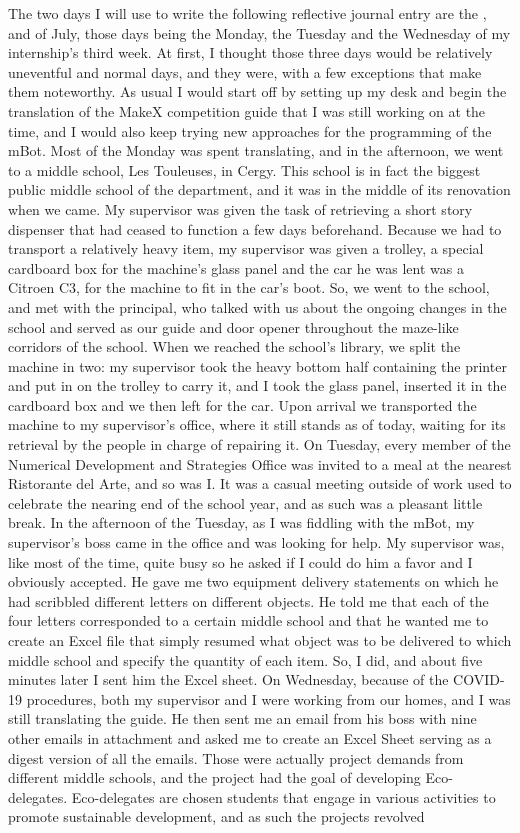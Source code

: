 \documentclass[12pt]{article}
\begin{document}
The two days I will use to write the following reflective journal entry are the ,  and  of July, those days being the Monday, the Tuesday and the Wednesday of my internship's third week. At first, I thought those three days would be relatively uneventful and normal days, and they were, with a few exceptions that make them noteworthy. As usual I would start off by setting up my desk and begin the translation of the MakeX competition guide that I was still working on at the time, and I would also keep trying new approaches for the programming of the mBot. Most of the Monday was spent translating, and in the afternoon, we went to a middle school, Les Touleuses, in Cergy. This school is in fact the biggest public middle school of the department, and it was in the middle of its renovation when we came. My supervisor was given the task of retrieving a short story dispenser that had ceased to function a few days beforehand. Because we had to transport a relatively heavy item, my supervisor was given a trolley, a special cardboard box for the machine's glass panel and the car he was lent was a Citroen C3, for the machine to fit in the car's boot. So, we went to the school, and met with the principal, who talked with us about the ongoing changes in the school and served as our guide and door opener throughout the maze-like corridors of the school. When we reached the school's library, we split the machine in two: my supervisor took the heavy bottom half containing the printer and put in on the trolley to carry it, and I took the glass panel, inserted it in the cardboard box and we then left for the car. Upon arrival we transported the machine to my supervisor's office, where it still stands as of today, waiting for its retrieval by the people in charge of repairing it. On Tuesday, every member of the Numerical Development and Strategies Office was invited to a meal at the nearest Ristorante del Arte, and so was I. It was a casual meeting outside of work used to celebrate the nearing end of the school year, and as such was a pleasant little break. In the afternoon of the Tuesday, as I was fiddling with the mBot, my supervisor's boss came in the office and was looking for help. My supervisor was, like most of the time, quite busy so he asked if I could do him a favor and I obviously accepted. He gave me two equipment delivery statements on which he had scribbled different letters on different objects. He told me that each of the four letters corresponded to a certain middle school and that he wanted me to create an Excel file that simply resumed what object was to be delivered to which middle school and specify the quantity of each item. So, I did, and about five minutes later I sent him the Excel sheet. On Wednesday, because of the COVID-19 procedures, both my supervisor and I were working from our homes, and I was still translating the guide. He then sent me an email from his boss with nine other emails in attachment and asked me to create an Excel Sheet serving as a digest version of all the emails. Those were actually project demands from different middle schools, and the project had the goal of developing Eco-delegates. Eco-delegates are chosen students that engage in various activities to promote sustainable development, and as such the projects revolved 
\end{document}
